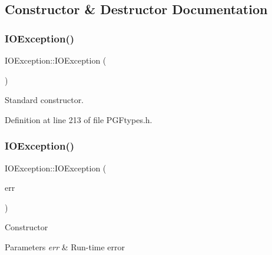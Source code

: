 \subsection{Constructor \& Destructor Documentation}
\mbox{\label{structIOException_ad1e8e7e09716ddc197a23611250fa180}} 
\subsubsection{\texorpdfstring{IOException()}{IOException()}\hspace{0.1cm}{\footnotesize\ttfamily [1/2]}}
{\footnotesize\ttfamily I\+O\+Exception\+::\+I\+O\+Exception (\begin{DoxyParamCaption}{ }\end{DoxyParamCaption})\hspace{0.3cm}{\ttfamily [inline]}}



Standard constructor. 



Definition at line 213 of file P\+G\+Ftypes.\+h.


\begin{DoxyCode}{0}

\end{DoxyCode}
\mbox{\label{structIOException_a376ee2ee1fd67ef6de01e64ff142badb}} 
\subsubsection{\texorpdfstring{IOException()}{IOException()}\hspace{0.1cm}{\footnotesize\ttfamily [2/2]}}
{\footnotesize\ttfamily I\+O\+Exception\+::\+I\+O\+Exception (\begin{DoxyParamCaption}\item[{O\+S\+Error}]{err }\end{DoxyParamCaption})\hspace{0.3cm}{\ttfamily [inline]}}

Constructor 
\begin{DoxyParams}{Parameters}
{\em err} & Run-\/time error \\
\hline
\end{DoxyParams}


